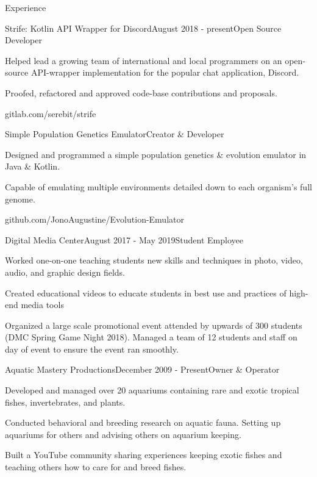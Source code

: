 \documentclass{resume} %
\begin{document}
\begin{rSection}{Experience}

\begin{rSubsection}{Strife: Kotlin API Wrapper for Discord}{August 2018 - present}{Open Source Developer}{}
\item Helped lead a growing team of international and local programmers on an open-source API-wrapper 
implementation for the popular chat application, Discord.
\item Proofed, refactored and approved code-base contributions and proposals.
\item gitlab.com/serebit/strife
\end{rSubsection}



\begin{rSubsection}{Simple Population Genetics Emulator}{}{Creator \&  Developer}{}
\item Designed and programmed a simple population genetics \& evolution emulator in Java \& Kotlin.
\item Capable of emulating multiple environments detailed down to each organism’s full genome.
\item github.com/JonoAugustine/Evolution-Emulator
\end{rSubsection}



\begin{rSubsection}{Digital Media Center}{August 2017 - May 2019}{Student Employee}{}
\item Worked one-on-one teaching students new skills and techniques in photo, video, audio, and graphic design fields.
\item Created educational videos to educate students in best use and practices of  high-end media tools
\item Organized a large scale promotional event attended by upwards of 300 students (DMC Spring Game Night 2018). Managed a team of 12 students and staff on day of event to ensure the event ran smoothly.


\begin{rSubsection}{Aquatic Mastery Productions}{December 2009 - Present}{Owner \& Operator}{}
\item Developed and managed over 20 aquariums containing rare and exotic tropical fishes, invertebrates, and plants.
\item Conducted behavioral and breeding research on aquatic fauna. Setting up aquariums for others and advising others on aquarium keeping.
\item Built a YouTube community sharing experiences keeping exotic fishes and teaching others how to care for and breed fishes.
\end{rSubsection}

\end{rSubsection}

\end{rSection}
\end{document}
